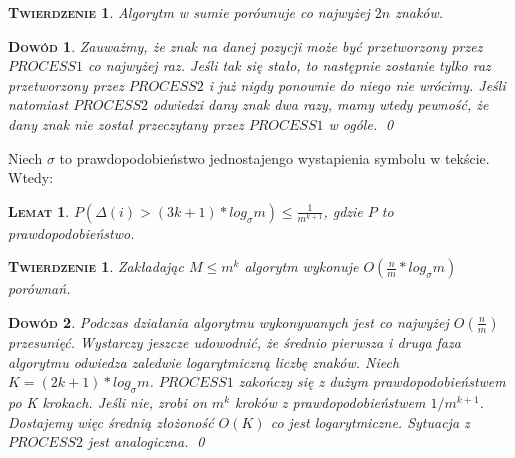 \documentclass[a4paper,11pt]{article}
\newtheorem{LEM}[DEF]{\textsc{Lemat}}
\newtheorem{TW}[DEF]{\textsc{Twierdzenie}}
\newtheorem*{PROF}{\textsc{Dowód}}
\begin{document}
\begin{TW}
Algorytm w sumie porównuje co najwyżej $2n$ znaków.
\end{TW}

\begin{PROF}
Zauważmy, że znak na danej pozycji może być przetworzony przez $PROCESS1$ co najwyżej raz. Jeśli tak się stało, to następnie zostanie tylko raz przetworzony przez $PROCESS2$ i już nigdy ponownie do niego nie wrócimy. Jeśli natomiast $PROCESS2$ odwiedzi dany znak dwa razy, mamy wtedy pewność, że dany znak nie został przeczytany przez $PROCESS1$ w ogóle. \qed
\end{PROF}

Niech $\sigma$ to prawdopodobieństwo jednostajengo wystapienia symbolu w tekście. Wtedy:

\begin{LEM}
$P(\Delta(i) > (3k + 1)*log_{\sigma}m) \leq \frac{1}{m^{k+1}}$, gdzie $P$ to prawdopodobieństwo.
\end{LEM}

\begin{TW}
Zakładając $M \leq m^k$ algorytm wykonuje $O(\frac{n}{m} * log_{\sigma} m)$ porównań.
\end{TW}

\begin{PROF}
Podczas działania algorytmu wykonywanych jest co najwyżej $O(\frac{n}{m})$ przesunięć.
Wystarczy jeszcze udowodnić, że średnio pierwsza i druga faza algorytmu odwiedza zaledwie logarytmiczną liczbę znaków. Niech $K = (2k + 1) * log _{\sigma} m$. $PROCESS1$ zakończy się z dużym prawdopodobieństwem po K krokach. Jeśli nie, zrobi on $m^k$ kroków z prawdopodobieństwem $1/m^{k+1}$. Dostajemy więc średnią złożoność $O(K)$ co jest logarytmiczne.
Sytuacja z $PROCESS2$ jest analogiczna. \qed
\end{PROF}
\end{document}

